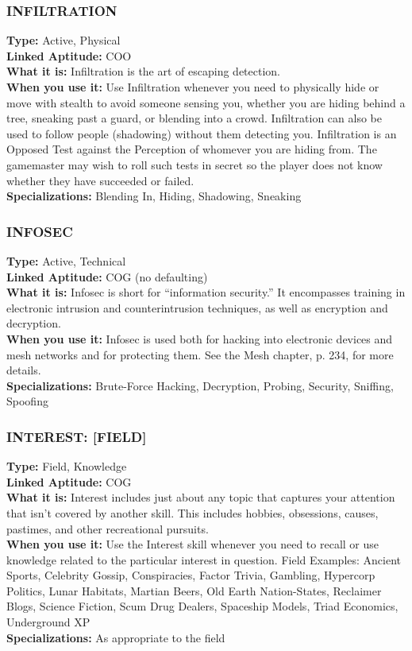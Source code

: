 \subsubsection{INFILTRATION}
\textbf{Type:} Active, Physical
\\ \textbf{Linked Aptitude:} COO
\\ \textbf{What it is:} Infiltration is the art of escaping
detection.
\\ \textbf{When you use it:} Use Infiltration whenever you
need to physically hide or move with stealth to avoid
someone sensing you, whether you are hiding behind
a tree, sneaking past a guard, or blending into a
crowd. Infiltration can also be used to follow people
(shadowing) without them detecting you. Infiltration
is an Opposed Test against the Perception of whomever you are hiding from. The gamemaster may wish
to roll such tests in secret so the player does not know
whether they have succeeded or failed.
\\ \textbf{Specializations:} Blending In, Hiding, Shadowing,
Sneaking

\subsubsection{INFOSEC}
\textbf{Type:} Active, Technical
\\ \textbf{Linked Aptitude:} COG (no defaulting)
\\ \textbf{What it is:} Infosec is short for “information security.” It encompasses training in electronic intrusion
and counterintrusion techniques, as well as encryption
and decryption.
\\ \textbf{When you use it:} Infosec is used both for hacking
into electronic devices and mesh networks and for
protecting them. See the Mesh chapter, p. 234, for
more details.
\\ \textbf{Specializations:} Brute-Force Hacking, Decryption,
Probing, Security, Sniffing, Spoofing

\subsubsection{INTEREST: [FIELD]}
\textbf{Type:} Field, Knowledge
\\ \textbf{Linked Aptitude:} COG
\\ \textbf{What it is:} Interest includes just about any topic
that captures your attention that isn’t covered by
another skill. This includes hobbies, obsessions,
causes, pastimes, and other recreational pursuits.
\\ \textbf{When you use it:} Use the Interest skill whenever
you need to recall or use knowledge related to the
particular interest in question.
Field Examples: Ancient Sports, Celebrity Gossip,
Conspiracies, Factor Trivia, Gambling, Hypercorp
Politics, Lunar Habitats, Martian Beers, Old Earth
Nation-States, Reclaimer Blogs, Science Fiction, Scum
Drug Dealers, Spaceship Models, Triad Economics,
Underground XP
\\ \textbf{Specializations:} As appropriate to the field

